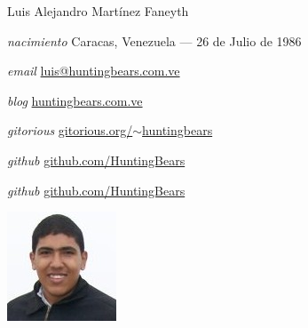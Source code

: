 \documentclass[11pt,letterpaper]{article}
\begin{document}
\begin{cv}{Luis Alejandro Mart\'inez Faneyth}
\vspace{1em}

\begin{minipage}{.7\linewidth}
\begin{cvlist}{}
\item[\textit{\large{nacimiento}}]{Caracas, Venezuela --- 26 de Julio de 1986}
\item[\textit{\large{email}}]{\href{mailto:luis@huntingbears.com.ve}{luis@huntingbears.com.ve}}
\item[\textit{\large{blog}}]{\href{http://huntingbears.com.ve/}{huntingbears.com.ve}}
\item[\textit{\large{gitorious}}]{\href{http://gitorious.org/~huntingbears}{gitorious.org/$\sim$huntingbears}}
\item[\textit{\large{github}}]{\href{http://github.com/HuntingBears}{github.com/HuntingBears}}
\item[\textit{\large{github}}]{\href{http://github.com/HuntingBears}{github.com/HuntingBears}}
\end{cvlist}
\end{minipage}
\begin{minipage}{.3\linewidth}
\includegraphics{curriculumvitae.jpg}
\end{minipage}
\vspace{1em}


\end{cv}
\end{document}
